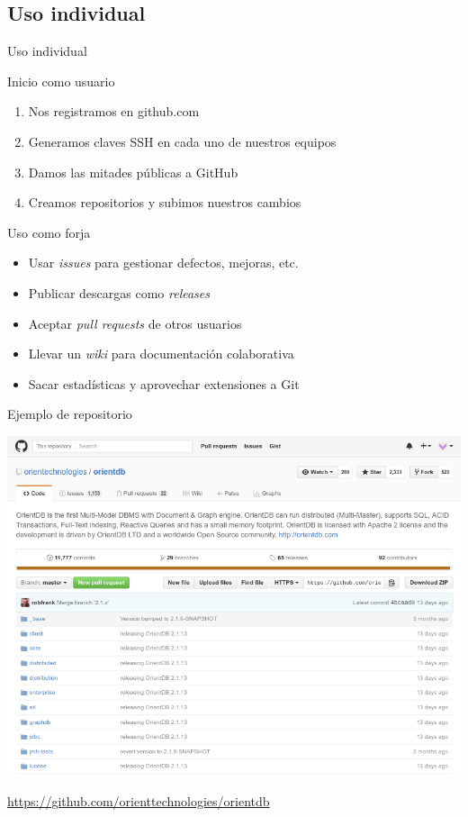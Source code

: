 \documentclass[xcolor=svgnames]{beamer}
\begin{document}
\subsection{Uso individual}

\begin{frame}{Uso individual}
  \begin{block}{Inicio como usuario}
    \begin{enumerate}
    \item Nos registramos en github.com
    \item Generamos claves SSH en cada uno de nuestros equipos
    \item Damos las mitades públicas a GitHub
    \item Creamos repositorios y subimos nuestros cambios
    \end{enumerate}
  \end{block}

  \begin{block}{Uso como forja}
    \begin{itemize}
    \item Usar \emph{issues} para gestionar defectos, mejoras, etc.
    \item Publicar descargas como \emph{releases}
    \item Aceptar \emph{pull requests} de otros usuarios
    \item Llevar un \emph{wiki} para documentación colaborativa
    \item Sacar estadísticas y aprovechar extensiones a Git
    \end{itemize}
  \end{block}
\end{frame}

\begin{frame}{Ejemplo de repositorio}
  \begin{center}
    \includegraphics[width=.9\textwidth,height=.8\textheight,keepaspectratio]{orientdb-repo}

    \url{https://github.com/orienttechnologies/orientdb}
  \end{center}
\end{frame}
\end{document}
